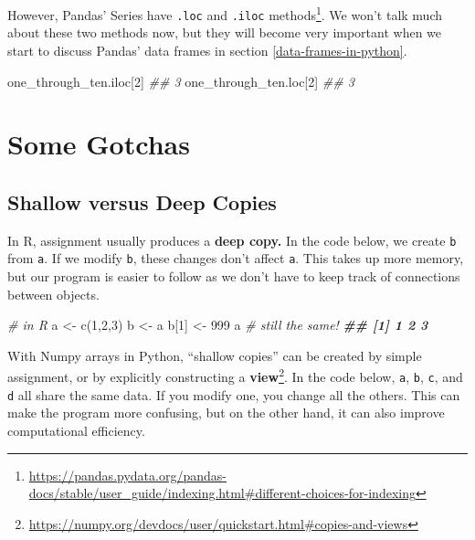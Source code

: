 \documentclass[
  12pt,
  krantz2]{krantz}
\makeatletter
\newenvironment{Shaded}{\begin{snugshade}}{\end{snugshade}}
\newcommand{\CommentTok}[1]{\textcolor[rgb]{0.37,0.37,0.37}{\textit{#1}}}
\newcommand{\DecValTok}[1]{\textcolor[rgb]{0.06,0.06,0.06}{#1}}
\newcommand{\DocumentationTok}[1]{\textcolor[rgb]{0.37,0.37,0.37}{\textbf{\textit{#1}}}}
\newcommand{\FunctionTok}[1]{\textcolor[rgb]{0,0,0}{#1}}
\newcommand{\NormalTok}[1]{#1}
\newcommand{\OtherTok}[1]{\textcolor[rgb]{0.37,0.37,0.37}{#1}}
\renewcommand{\href}[2]{#2\footnote{\url{#1}}}
\newenvironment{kframe}{%
\medskip{}
\setlength{\fboxsep}{.8em}
 \def\at@end@of@kframe{}%
 \ifinner\ifhmode%
  \def\at@end@of@kframe{\end{minipage}}%
  \begin{minipage}{\columnwidth}%
 \fi\fi%
 \def\FrameCommand##1{\hskip\@totalleftmargin \hskip-\fboxsep
 \colorbox{shadecolor}{##1}\hskip-\fboxsep
     \hskip-\linewidth \hskip-\@totalleftmargin \hskip\columnwidth}%
 \MakeFramed {\advance\hsize-\width
   \@totalleftmargin\z@ \linewidth\hsize
   \@setminipage}}%
 {\par\unskip\endMakeFramed%
 \at@end@of@kframe}
\renewenvironment{Shaded}{\begin{kframe}}{\end{kframe}}
\makeatother
\begin{document}
However, \href{https://pandas.pydata.org/pandas-docs/stable/user_guide/indexing.html\#different-choices-for-indexing}{Pandas' Series have \texttt{.loc} and \texttt{.iloc} methods}. We won't talk much about these two methods now, but they will become very important when we start to discuss Pandas' data frames in section \ref{data-frames-in-python}.

\begin{Shaded}
\begin{Highlighting}[]
\NormalTok{one\_through\_ten.iloc[}\DecValTok{2}\NormalTok{]}
\CommentTok{\#\# 3}
\NormalTok{one\_through\_ten.loc[}\DecValTok{2}\NormalTok{]}
\CommentTok{\#\# 3}
\end{Highlighting}
\end{Shaded}

\hypertarget{some-gotchas}{%
\section{Some Gotchas}\label{some-gotchas}}

\hypertarget{shallow-versus-deep-copies}{%
\subsection{Shallow versus Deep Copies}\label{shallow-versus-deep-copies}}

In R, assignment usually produces a \textbf{deep copy.} In the code below, we create \texttt{b} from \texttt{a}. If we modify \texttt{b}, these changes don't affect \texttt{a}. This takes up more memory, but our program is easier to follow as we don't have to keep track of connections between objects.

\begin{Shaded}
\begin{Highlighting}[]
\CommentTok{\# in R}
\NormalTok{a }\OtherTok{\textless{}{-}} \FunctionTok{c}\NormalTok{(}\DecValTok{1}\NormalTok{,}\DecValTok{2}\NormalTok{,}\DecValTok{3}\NormalTok{)}
\NormalTok{b }\OtherTok{\textless{}{-}}\NormalTok{ a}
\NormalTok{b[}\DecValTok{1}\NormalTok{] }\OtherTok{\textless{}{-}} \DecValTok{999}
\NormalTok{a }\CommentTok{\# still the same!}
\DocumentationTok{\#\# [1] 1 2 3}
\end{Highlighting}
\end{Shaded}

With Numpy arrays in Python, \href{https://numpy.org/devdocs/user/quickstart.html\#copies-and-views}{``shallow copies'' can be created by simple assignment, or by explicitly constructing a \textbf{view}}. In the code below, \texttt{a}, \texttt{b}, \texttt{c}, and \texttt{d} all share the same data. If you modify one, you change all the others. This can make the program more confusing, but on the other hand, it can also improve computational efficiency.
\end{document}
